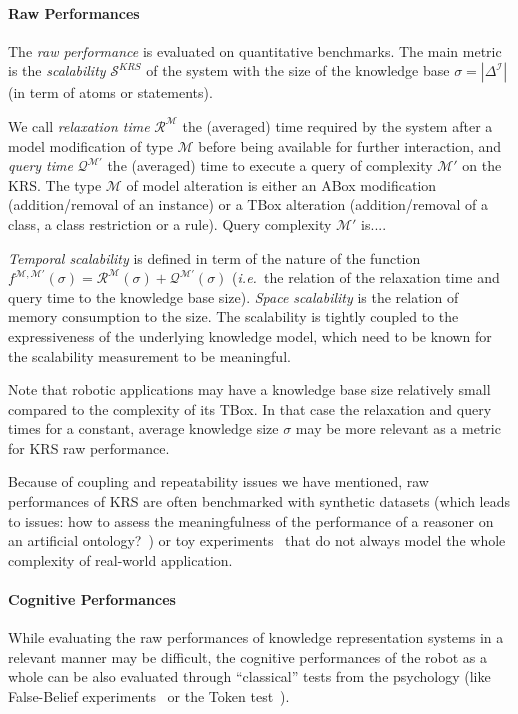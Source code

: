 \documentclass[a4paper, twocolumn]{article}
\newcommand{\ie}{{\textit{i.e.\ }}}
\begin{document}
\paragraph{Raw Performances} The \emph{raw performance} is evaluated on
quantitative benchmarks. The main metric is the \emph{scalability}
$\mathcal{S}^{KRS}$ of the system with the size of the knowledge base
$\sigma=|\Delta^{\mathcal{I}}|$  (in term of atoms or statements).

We call \emph{relaxation time} $\mathcal{R}^{\mathcal{M}}$ the (averaged) time
required by the system after a model modification of type $\mathcal{M}$ before
being available for further interaction, and \emph{query time}
$\mathcal{Q}^{\mathcal{M}'}$ the (averaged) time to execute a query of
complexity $\mathcal{M}'$ on the KRS. The type $\mathcal{M}$ of model
alteration is either an ABox modification (addition/removal of an instance) or
a TBox alteration (addition/removal of a class, a class restriction or a rule).
Query complexity $\mathcal{M}'$ is....

\emph{Temporal scalability} is defined in term of the nature of the function
$f^{\mathcal{M}, \mathcal{M}'}(\sigma) = \mathcal{R}^{\mathcal{M}}(\sigma) +
\mathcal{Q}^{\mathcal{M}'}(\sigma)$ (\ie the relation of the relaxation time
and query time to the knowledge base size). \emph{Space scalability} is the
relation of memory consumption to the size. The scalability is tightly coupled
to the expressiveness of the underlying knowledge model, which need to be known
for the scalability measurement to be meaningful.

Note that robotic applications may have a knowledge base size relatively small
compared to the complexity of its TBox. In that case the relaxation and query
times for a constant, average knowledge size $\sigma$ may be more relevant as a
metric for KRS raw performance.

Because of coupling and repeatability issues we have mentioned, raw
performances of KRS are often benchmarked with synthetic datasets (which leads
to issues: how to assess the meaningfulness of the performance of a reasoner on
an artificial ontology?~\cite{Bail2010}) or toy experiments~\cite{Chong2009}
that do not always model the whole complexity of real-world application.

\paragraph{Cognitive Performances} While evaluating the raw performances of
knowledge representation systems in a relevant manner may be difficult, the cognitive
performances of the robot as a whole can be also evaluated through
``classical'' tests from the psychology (like False-Belief
experiments~\cite{Leslie2000} or the Token test~\cite{DiSimoni1978}).
\end{document}
